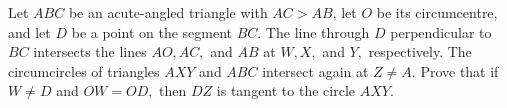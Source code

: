 \begin{problem}
    Let $ABC$ be an acute-angled triangle with $AC > AB$, let $O$ be its circumcentre, and let $D$ be a point on the segment $BC$. The line through $D$ perpendicular to $BC$ intersects the lines $AO, AC,$ and $AB$ at $W, X,$ and $Y,$ respectively. The circumcircles of triangles $AXY$ and $ABC$ intersect again at $Z \ne A$.
Prove that if $W \ne D$ and $OW = OD,$ then $DZ$ is tangent to the circle $AXY.$

    \label{22ISLG4}
\end{problem}